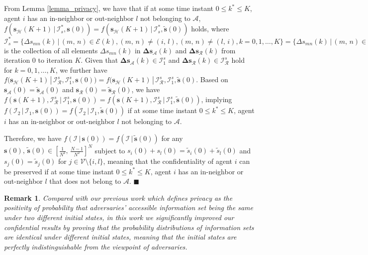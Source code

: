 \documentclass{IEEEtran}
\newtheorem{Remark}{Remark}
\begin{document}
From Lemma \ref{lemma_privacy}, we have that if at some time instant $0\leq k^* \leq K$, agent $i$ has an in-neighbor or out-neighbor $l$ not belonging to $\mathcal{A}$, $f(\mathbf{s}_{\mathcal{H}}(K+1) \, | \, \mathcal{I}_s^*, \mathbf{s}(0)) = f(\mathbf{s}_{\mathcal{H}}(K+1) \, | \, \mathcal{I}_s^*, \tilde{\mathbf{s}}(0))$ holds, where $\mathcal{I}_s^* = \{\Delta s_{mn}(k) \, | \, (m,\,n) \in \mathcal{E}(k), (m,\,n)\neq (i,\,l), (m,\,n)\neq (l,\,i), k=0,1,\ldots,K\} = \{\Delta s_{mn}(k) \, | \, (m,\,n) \in \mathcal{E_A}(k) \cup \mathcal{E_R}(k), k=0,1,\ldots,K\}$ is the collection of all elements $\Delta s_{mn}(k)$ in $\boldsymbol{\Delta}\mathbf{s}_{\mathcal{A}}(k)$ and $\boldsymbol{\Delta}\mathbf{s}_{\mathcal{R}}(k)$ from iteration $0$ to iteration $K$. Given that $\boldsymbol{\Delta}\mathbf{s}_{\mathcal{A}}(k) \in \mathcal{I}_1^s$ and $\boldsymbol{\Delta}\mathbf{s}_{\mathcal{R}}(k) \in \mathcal{I}_{\mathcal{R}}^s$ hold for $k=0,1,\ldots,K$, we further have $f(\mathbf{s}_{\mathcal{H}}(K+1) \, | \, \mathcal{I}_{\mathcal{R}}^s, \mathcal{I}_1^s, \mathbf{s}(0)) = f(\mathbf{s}_{\mathcal{H}}(K+1) \, | \, \mathcal{I}_{\mathcal{R}}^s, \mathcal{I}_1^s, \tilde{\mathbf{s}}(0)$. Based on $\mathbf{s}_{\mathcal{A}}(0)=\tilde{\mathbf{s}}_{\mathcal{A}}(0)$ and $\mathbf{s}_{\mathcal{R}}(0)=\tilde{\mathbf{s}}_{\mathcal{R}}(0)$, we have $f(\mathbf{s}(K+1), \mathcal{I}_{\mathcal{R}}^s \, | \, \mathcal{I}_1^s, \mathbf{s}(0)) = f(\mathbf{s}(K+1), \mathcal{I}_{\mathcal{R}}^s \, | \, \mathcal{I}_1^s, \tilde{\mathbf{s}}(0))$, implying $f(\mathcal{I}_2 \, | \, \mathcal{I}_1, \mathbf{s}(0)) =f(\mathcal{I}_2 \, | \, \mathcal{I}_1, \tilde{\mathbf{s}}(0))$ if at some time instant $0\leq k^* \leq K$, agent $i$ has an in-neighbor or out-neighbor $l$ not belonging to $\mathcal{A}$.

Therefore, we have $f(\mathcal{I} \, | \, \mathbf{s}(0)) =f(\mathcal{I} \, | \, \tilde{\mathbf{s}}(0))$ for any $\mathbf{s}(0), \, \tilde{\mathbf{s}}(0) \in [\frac{1}{N^2}, \, \frac{N-1}{N^2}]^N$ subject to $s_i(0) + s_l(0) = \tilde{s}_i(0) + \tilde{s}_l(0)$ and $s_j(0)=\tilde{s}_j(0)$ for $j\in \mathcal{V}\setminus \{i,l\}$, meaning that the confidentiality of agent $i$ can be preserved if at some time instant $0\leq k^* \leq K$, agent $i$ has an in-neighbor or out-neighbor $l$ that does not belong to $\mathcal{A}$. \hfill{$\blacksquare$}

\begin{Remark}\label{remark_difference_our_CNS}
	Compared with our previous work \cite{Huan2018CNS} which defines privacy as the positivity of probability that adversaries' accessible information set being the same under two different initial states, in this work we significantly improved our confidential results by proving that the probability distributions of information sets are identical under different initial states, meaning that the initial states are perfectly indistinguishable from the viewpoint of adversaries.
\end{Remark}
\end{document}
